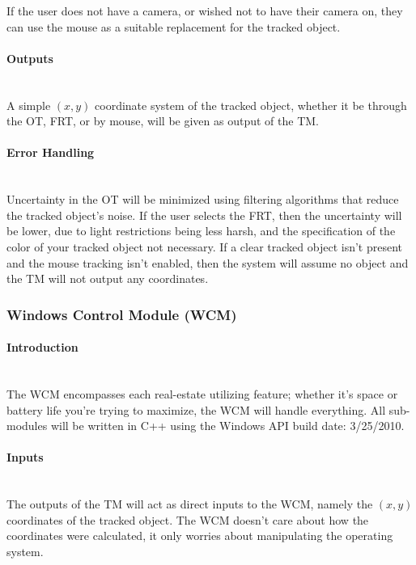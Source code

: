 \documentclass[titlepage]{article}
\newcommand{\myparagraph}[1]{\paragraph{#1}\mbox{}\\}
\begin{document}
If the user does not have a camera, or wished not to have their camera on, they can use the mouse as a suitable replacement for the tracked object. 

\myparagraph{Outputs}
A simple $(x,y)$ coordinate system of the tracked object, whether it be through the OT, FRT, or by mouse, will be given as output of the TM.

\myparagraph{Error Handling}
Uncertainty in the OT will be minimized using filtering algorithms that reduce the tracked object's noise. If the user selects the FRT, then the uncertainty will be lower, due to light restrictions being less harsh, and the specification of the color of your tracked object not necessary. If a clear tracked object isn't present and the mouse tracking isn't enabled, then the system will assume no object and the TM will not output any coordinates.

\subsubsection{Windows Control Module (WCM)}

\myparagraph{Introduction}
The WCM encompasses each real-estate utilizing feature; whether it's space or battery life you're trying to maximize, the WCM will handle everything. All sub-modules will be written in C++ using the Windows API build date: 3/25/2010.

\myparagraph{Inputs}
The outputs of the TM will act as direct inputs to the WCM, namely the $(x,y)$ coordinates of the tracked object. The WCM doesn't care about how the coordinates were calculated, it only worries about manipulating the operating system.
\end{document}
